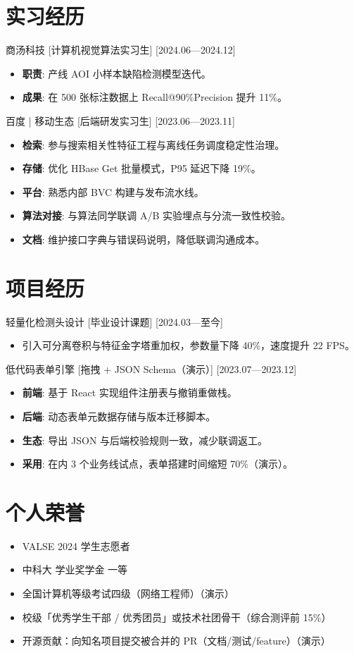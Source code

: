 \documentclass{resume-photo}
\begin{document}
\section{实习经历}
\ResumeItem
{商汤科技}
[\textnormal{计算机视觉算法实习生}]
[2024.06—2024.12]

\begin{itemize}
  \item \textbf{职责}: 产线 AOI 小样本缺陷检测模型迭代。
  \item \textbf{成果}: 在 500 张标注数据上 Recall@90\%Precision 提升 11\%。
\end{itemize}


\ResumeItem
{百度 | 移动生态}
[\textnormal{后端研发实习生}]
[2023.06—2023.11]

\begin{itemize}
  \item \textbf{检索}: 参与搜索相关性特征工程与离线任务调度稳定性治理。
  \item \textbf{存储}: 优化 HBase Get 批量模式，P95 延迟下降 19\%。
  \item \textbf{平台}: 熟悉内部 BVC 构建与发布流水线。
  \item \textbf{算法对接}: 与算法同学联调 A/B 实验埋点与分流一致性校验。
  \item \textbf{文档}: 维护接口字典与错误码说明，降低联调沟通成本。
\end{itemize}



\section{项目经历}
\ResumeItem
{轻量化检测头设计}
[\textnormal{毕业设计课题}]
[2024.03—至今]

\begin{itemize}
  \item 引入可分离卷积与特征金字塔重加权，参数量下降 40\%，速度提升 22 FPS。
\end{itemize}


\ResumeItem
{低代码表单引擎}
[\textnormal{拖拽 + JSON Schema（演示）}]
[2023.07—2023.12]

\begin{itemize}
  \item \textbf{前端}: 基于 React 实现组件注册表与撤销重做栈。
  \item \textbf{后端}: 动态表单元数据存储与版本迁移脚本。
  \item \textbf{生态}: 导出 JSON 与后端校验规则一致，减少联调返工。
  \item \textbf{采用}: 在内 3 个业务线试点，表单搭建时间缩短 70\%（演示）。
\end{itemize}



\section{个人荣誉}
\begin{itemize}
  \item VALSE 2024 学生志愿者
  \item 中科大 学业奖学金 一等
  \item 全国计算机等级考试四级（网络工程师）（演示）
  \item 校级「优秀学生干部 / 优秀团员」或技术社团骨干（综合测评前 15\%）
  \item 开源贡献：向知名项目提交被合并的 PR（文档/测试/feature）（演示）
\end{itemize}
\end{document}
